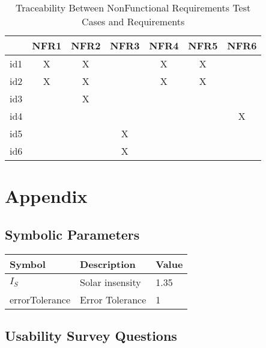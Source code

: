 \documentclass[12pt, titlepage]{article}
\begin{document}
\begin{table}[h!]
\centering
\begin{tabular}{|c|c|c|c|c|c|c|}
\hline        
	& NFR1& NFR2 & NFR3 &NFR4 & NFR5 &NFR6 \\
\hline
id1        & X & X &    & X & X &     \\ \hline
id2        & X & X &    & X & X &     \\ \hline
id3        &    & X &    &    &    &      \\ \hline
id4        &    &    &     &    &    & X  \\ \hline
id5        &    &    & X &    &    &      \\ \hline
id6        &    &    & X &    &    &      \\ \hline


\hline
\end{tabular}
\caption{Traceability Between NonFunctional Requirements Test Cases and
Requirements}
\label{Table:NFRtrace}
\end{table}




\newpage


 
%


\newpage

\section{Appendix}


\subsection{Symbolic Parameters}

  \noindent \begin{tabular}{l l l} 
    \toprule		
    \textbf{Symbol} & \textbf{Description} & \textbf{Value}\\
    \midrule 
    $I_{S}$ & Solar insensity &1.35  \\
errorTolerance & Error Tolerance & 1\\
    \bottomrule
  \end{tabular}


\subsection{Usability Survey Questions}
\end{document}
